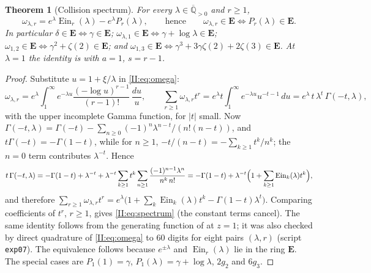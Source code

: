 \documentclass[11pt,a4paper]{article}
\newcommand{\Qbar}{\overline{\mathbb Q}}
\newcommand{\Ein}{\operatorname{Ein}}
\newcommand{\EE}{\mathbf E}
\newtheorem{theorem}{Theorem}[section]
\theoremstyle{definition}
\theoremstyle{remark}
\numberwithin{equation}{section}
\begin{document}
\begin{theorem}[Collision spectrum]\label{II:thm:spectrum}
For every $\lambda\in\Qbar_{>0}$ and $r\ge1$,
\begin{equation}\label{II:eq:spectrum}
 \omega_{\lambda,r}=e^{\lambda}\Ein_r(\lambda)-e^{\lambda}P_r(\lambda),
 \qquad\text{hence}\qquad
 \omega_{\lambda,r}\in\EE\iff P_r(\lambda)\in\EE .
\end{equation}
In particular $\delta\in\EE\iff\gamma\in\EE$; $\omega_{\lambda,1}\in\EE\iff\gamma+\log\lambda\in\EE$;
$\omega_{1,2}\in\EE\iff\gamma^2+\zeta(2)\in\EE$; and
$\omega_{1,3}\in\EE\iff\gamma^3+3\gamma\zeta(2)+2\zeta(3)\in\EE$.
At $\lambda=1$ the identity is \cite[eq.~(4.4)]{FRmixed} with $a=1$, $s=r-1$.
\end{theorem}
\begin{proof}
Substitute $u=1+\xi/\lambda$ in \eqref{II:eq:omega}:
\[
 \omega_{\lambda,r}=e^\lambda\int_1^\infty e^{-\lambda u}\frac{(-\log u)^{r-1}}{(r-1)!}\,\frac{du}u,
 \qquad
 \sum_{r\ge1}\omega_{\lambda,r}t^r=e^\lambda t\int_1^\infty e^{-\lambda u}u^{-t-1}\,du
 =e^\lambda\,t\,\lambda^{t}\,\Gamma(-t,\lambda),
\]
with the upper incomplete Gamma function, for $|t|$ small. Now
$\Gamma(-t,\lambda)=\Gamma(-t)-\sum_{n\ge0}(-1)^n\lambda^{n-t}/(n!(n-t))$, and
$t\Gamma(-t)=-\Gamma(1-t)$, while for $n\ge1$, $-t/(n-t)=-\sum_{k\ge1}t^k/n^k$; the $n=0$
term contributes $\lambda^{-t}$. Hence
\[
 t\,\Gamma(-t,\lambda)=-\Gamma(1-t)+\lambda^{-t}+\lambda^{-t}\sum_{k\ge1}t^k\sum_{n\ge1}\frac{(-1)^{n-1}\lambda^n}{n^k\,n!}
 =-\Gamma(1-t)+\lambda^{-t}\Bigl(1+\sum_{k\ge1}\Ein_k(\lambda)t^k\Bigr),
\]
and therefore $\sum_{r\ge1}\omega_{\lambda,r}t^r=e^\lambda\bigl(1+\sum_k\Ein_k(\lambda)t^k-\Gamma(1-t)\lambda^t\bigr)$.
Comparing coefficients of $t^r$, $r\ge1$, gives \eqref{II:eq:spectrum} (the constant terms
cancel). The same identity follows from the generating function of
\cite[Prop.~``All-order mixed jet'']{K002} at $z=1$; it was also checked by direct quadrature
of \eqref{II:eq:omega} to $60$ digits for eight pairs $(\lambda,r)$ (script \texttt{exp07}).
The equivalence follows because $e^{\pm\lambda}$ and $\Ein_r(\lambda)$ lie in the ring
$\EE$. The special cases are $P_1(1)=\gamma$, $P_1(\lambda)=\gamma+\log\lambda$, $2g_2$ and
$6g_3$.
\end{proof}
\end{document}
